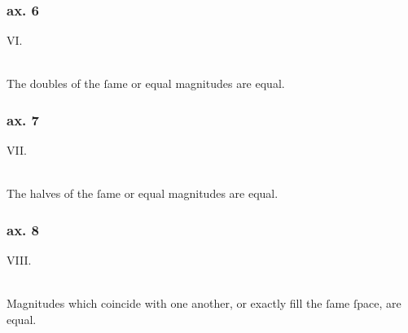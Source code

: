 \begin{minipage}{0.165\textwidth}
  \phantom{}
\end{minipage}%

\hfill

\begin{minipage}{0.165\textwidth}
  \phantom{}
\end{minipage}%
\begin{minipage}{0.67\textwidth}
  \subsubsection{ax. 6}
  \begin{center}
    VI.\label{ax6}\\
    \hfill\\
    \raggedright The doubles of the ſame or equal magnitudes are equal.\\
  \end{center}
  \subsubsection{ax. 7}
  \begin{center}
    VII.\label{ax7}\\
    \hfill\\
    \raggedright The halves of the ſame or equal magnitudes are equal.\\
  \end{center}
  \subsubsection{ax. 8}
  \begin{center}
    VIII.\label{ax8}\\
    \hfill\\
    \raggedright Magnitudes which coincide with one another, or exactly fill the ſame ſpace, are equal.
  \end{center}
\end{minipage}%
\begin{minipage}{0.165\textwidth}
  \phantom{}
\end{minipage}%

\hfill

